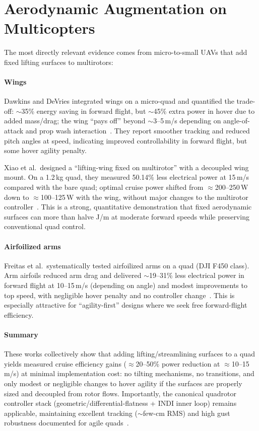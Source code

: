 \section{Aerodynamic Augmentation on Multicopters}

The most directly relevant evidence comes from micro-to-small UAVs that add fixed lifting surfaces to multirotors:

\paragraph{Wings}
Dawkins and DeVries integrated wings on a micro-quad and quantified the trade-off: $\sim$35\% energy saving in forward flight, but $\sim$45\% extra power in hover due to added mass/drag; the wing ``pays off'' beyond $\sim$3--5\,m/s depending on angle-of-attack and prop wash interaction~\cite{Dawkins2018}.
They report smoother tracking and reduced pitch angles at speed, indicating improved controllability in forward flight, but some hover agility penalty.

Xiao et al.\ designed a ``lifting-wing fixed on multirotor'' with a decoupled wing mount.
On a 1.2\,kg quad, they measured 50.14\% less electrical power at 15\,m/s compared with the bare quad; optimal cruise power shifted from $\approx$200--250\,W down to $\approx$100--125\,W with the wing, without major changes to the multirotor controller~\cite{Xiao2020}.
This is a strong, quantitative demonstration that fixed aerodynamic surfaces can more than halve J/m at moderate forward speeds while preserving conventional quad control.

\paragraph{Airfoilized arms}
Freitas et al.\ systematically tested airfoilized arms on a quad (DJI F450 class).
Arm airfoils reduced arm drag and delivered $\sim$19--31\% less electrical power in forward flight at 10--15\,m/s (depending on angle) and modest improvements to top speed, with negligible hover penalty and no controller change~\cite{Freitas2025}.
This is especially attractive for ``agility-first'' designs where we seek free forward-flight efficiency.

\paragraph{Summary}
These works collectively show that adding lifting/streamlining surfaces to a quad yields measured cruise efficiency gains ($\approx$20--50\% power reduction at $\approx$10--15\,m/s) at minimal implementation cost: no tilting mechanisms, no transitions, and only modest or negligible changes to hover agility if the surfaces are properly sized and decoupled from rotor flows.
Importantly, the canonical quadrotor controller stack (geometric/differential-flatness + INDI inner loop) remains applicable, maintaining excellent tracking ($\sim$few-cm RMS) and high gust robustness documented for agile quads~\cite{Tal2018,Foehn2022,Sun2021}.



